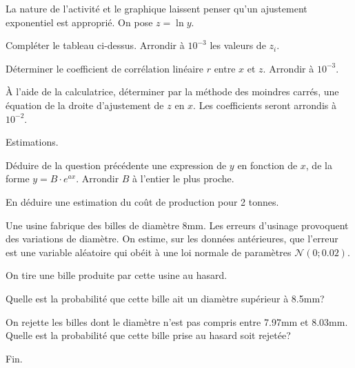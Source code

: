 \documentclass[a4paper,12pt]{scrartcl}
\begin{document}
\question{}
La nature de l'activité et le graphique laissent penser qu'un ajustement exponentiel est approprié. On pose $z = \ln y$.

\subquestion{}
Compléter le tableau ci-dessus.
Arrondir à $10^{-3}$ les valeurs de $z_i$.

\subquestion{}
Déterminer le coefficient de corrélation linéaire $r$ entre $x$ et $z$. Arrondir à $10^{-3}$.

\subquestion{}\label{question}
À l'aide de la calculatrice, déterminer par la méthode des moindres carrés, une équation de la droite d'ajustement de $z$
en $x$. Les coefficients seront arrondis à $10^{-2}$.

\question{}
Estimations.

\subquestion{}
Déduire de la question précédente une expression de $y$ en fonction de $x$, de la forme $y = B \cdot e^{ax}$. Arrondir $B$ à l'entier le plus proche.

\subquestion{}
En déduire une estimation du coût de production pour 2 tonnes.


 Une usine fabrique des billes de diamètre 8mm. Les erreurs d'usinage provoquent des variations de diamètre. On estime, sur les données antérieures, que l'erreur est une variable aléatoire qui obéit à une loi normale de paramètres $\mathcal{N}(0;0.02)$.

On tire une bille produite par cette usine au hasard.

\question{}
Quelle est la probabilité que cette bille ait un diamètre supérieur à 8.5mm?

\question{}
On rejette les billes dont le diamètre n'est pas compris entre 7.97mm et 8.03mm. Quelle est la probabilité que cette bille prise au hasard soit rejetée?

\trait

\begin{center}
Fin.
\end{center}
\end{document}
